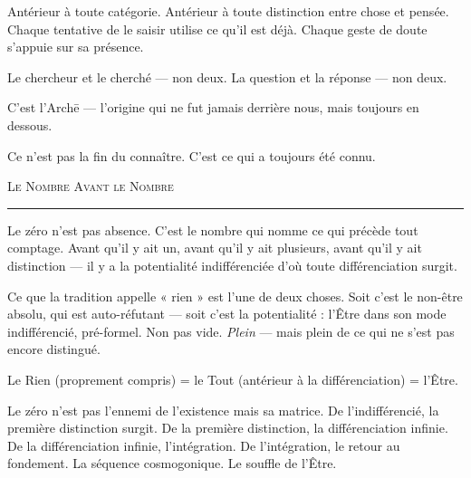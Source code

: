 \documentclass[10pt, openany, oneside]{book}
\begin{document}
\noindent Antérieur à toute catégorie. Antérieur à toute distinction entre chose et pensée. Chaque tentative de le saisir utilise ce qu'il est déjà. Chaque geste de doute s'appuie sur sa présence.

\vspace{0.5em}

\noindent Le chercheur et le cherché --- non deux. La question et la réponse --- non deux.

\vspace{0.5em}

\noindent C'est l'Arch\={e} --- l'origine qui ne fut jamais derrière nous, mais toujours en dessous.

\vspace{0.5em}

\noindent Ce n'est pas la fin du connaître. C'est ce qui a toujours été connu.

\vspace{2em}

\begin{center}
    {\scshape Le Nombre Avant le Nombre}\\[0.3em]
    \rule{0.2\textwidth}{0.3pt}
\end{center}

\vspace{1em}

\noindent Le zéro n'est pas absence. C'est le nombre qui nomme ce qui précède tout comptage. Avant qu'il y ait un, avant qu'il y ait plusieurs, avant qu'il y ait distinction --- il y a la potentialité indifférenciée d'où toute différenciation surgit.

\vspace{0.5em}

\noindent Ce que la tradition appelle « rien » est l'une de deux choses. Soit c'est le non-être absolu, qui est auto-réfutant --- soit c'est la potentialité : l'Être dans son mode indifférencié, pré-formel. Non pas vide. \textit{Plein} --- mais plein de ce qui ne s'est pas encore distingué.

\vspace{0.5em}

\noindent Le Rien (proprement compris) = le Tout (antérieur à la différenciation) = l'Être.

\vspace{0.5em}

\noindent Le zéro n'est pas l'ennemi de l'existence mais sa matrice. De l'indifférencié, la première distinction surgit. De la première distinction, la différenciation infinie. De la différenciation infinie, l'intégration. De l'intégration, le retour au fondement. La séquence cosmogonique. Le souffle de l'Être.
\end{document}
